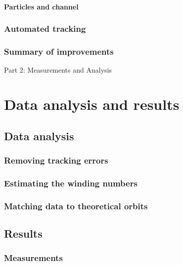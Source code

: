 \documentclass[]{report}
\begin{document}
\subsection{Particles and channel}




\section{Automated tracking}
     

\section{Summary of improvements}

 Part 2: Measurements and Analysis


\part{Data analysis and results}
\chapter{Data analysis}


\section{Removing tracking errors}


\section{Estimating the winding numbers}


\section{Matching data to theoretical orbits}



\chapter{Results}

\section{Measurements}

\end{document}
